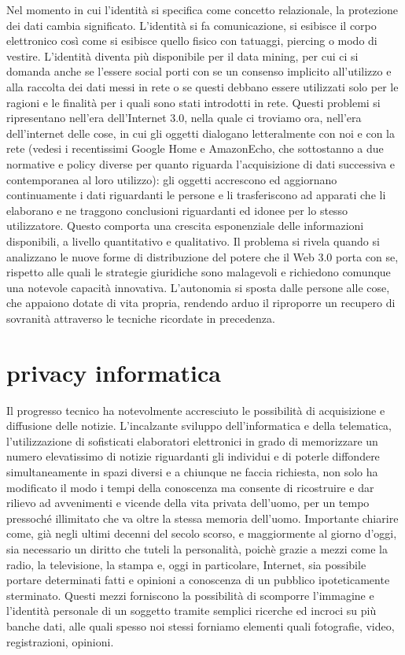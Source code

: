 Nel momento in cui l’identità si specifica come concetto relazionale, la protezione dei dati cambia significato. L’identità si fa comunicazione, si esibisce il corpo elettronico così come si esibisce quello fisico con tatuaggi, piercing o modo di vestire. L’identità diventa più disponibile per il data mining, per cui ci si domanda anche se l’essere social porti con se un consenso implicito all’utilizzo e alla raccolta dei dati messi in rete o se questi debbano essere utilizzati solo per le ragioni e le finalità per i quali sono stati introdotti in rete. Questi problemi si ripresentano nell’era dell’Internet 3.0, nella quale ci troviamo ora, nell’era dell’internet delle cose, in cui gli oggetti dialogano letteralmente con noi e con la rete (vedesi i recentissimi Google Home e AmazonEcho, che sottostanno a due normative e policy diverse per quanto riguarda l’acquisizione di dati successiva e contemporanea al loro utilizzo): gli oggetti accrescono ed aggiornano continuamente i dati riguardanti le persone e li trasferiscono ad apparati che li elaborano e ne traggono conclusioni riguardanti ed idonee per lo stesso utilizzatore.
Questo comporta una crescita esponenziale delle informazioni disponibili, a livello quantitativo e qualitativo. Il problema si rivela quando si analizzano le nuove forme di distribuzione del potere che il Web 3.0 porta con se, rispetto alle quali le strategie giuridiche sono malagevoli e richiedono comunque una notevole capacità innovativa. L’autonomia si sposta dalle persone alle cose, che appaiono dotate di vita propria, rendendo arduo il riproporre un recupero di sovranità attraverso le tecniche ricordate in precedenza.

\section{privacy informatica}
Il progresso tecnico ha notevolmente accresciuto le possibilità di acquisizione e diffusione delle notizie. L'incalzante sviluppo dell'informatica e della telematica, l'utilizzazione di sofisticati elaboratori elettronici in grado di memorizzare un numero elevatissimo di notizie riguardanti gli individui e di poterle diffondere simultaneamente in spazi diversi e a chiunque ne faccia richiesta, non solo ha modificato il modo i tempi della conoscenza ma consente di ricostruire e dar rilievo ad avvenimenti e vicende della vita privata dell'uomo, per un tempo pressoché illimitato che va oltre la stessa memoria dell'uomo.
Importante chiarire come, già negli ultimi decenni del secolo scorso, e maggiormente al giorno d'oggi, sia necessario un diritto che tuteli la personalità, poichè grazie a mezzi come la radio, la televisione, la stampa e, oggi in particolare, Internet, sia possibile portare determinati fatti e opinioni a conoscenza di un pubblico ipoteticamente sterminato. Questi mezzi forniscono la possibilità di scomporre l'immagine e l'identità personale di un soggetto tramite semplici ricerche ed incroci su più banche dati, alle quali spesso noi stessi forniamo elementi quali fotografie, video, registrazioni, opinioni.


